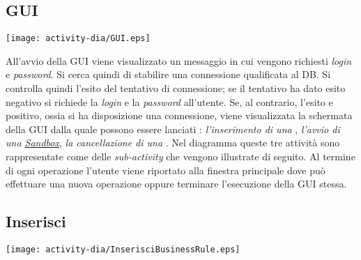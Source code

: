 \subsection{GUI}
\begin{center}
 \texttt{[image: activity-dia/GUI.eps]}
\end{center}
All'avvio della GUI viene visualizzato un messaggio in cui vengono richiesti \textit{login} e \textit{password}. Si cerca quindi di stabilire una connessione qualificata al DB. 
Si controlla quindi l'esito del tentativo di connessione; se il tentativo ha dato esito negativo si richiede la \textit{login} e la
 \textit{password} all'utente. Se, al contrario, l'esito e positivo, ossia si ha disposizione una connessione, viene visualizzata la schermata della GUI dalla quale  possono essere lanciati :\textit{ l'inserimento di una \br}, \textit{l'avvio di una \underline{Sandbox}}, \textit{la cancellazione di una \br}.
Nel diagramma queste tre attivit\`a sono rappresentate come delle \textit{sub-activity} che vengono illustrate di seguito. Al termine di ogni operazione l'utente viene riportato alla finestra principale dove pu\`o effettuare una nuova operazione oppure terminare l'esecuzione della GUI stessa.

\subsection{Inserisci \br}
\begin{center}
 \texttt{[image: activity-dia/InserisciBusinessRule.eps]}
\end{center}

